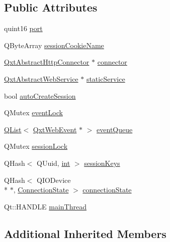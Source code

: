 \subsection*{Public Attributes}
\begin{DoxyCompactItemize}
\item 
quint16 \hyperlink{class_qxt_http_session_manager_private_afaed4122891eaeae95a49b4c06194a71}{port}
\item 
Q\-Byte\-Array \hyperlink{class_qxt_http_session_manager_private_afff38a099b0c4d6a1f7da9b5eca8fac6}{session\-Cookie\-Name}
\item 
\hyperlink{class_qxt_abstract_http_connector}{Qxt\-Abstract\-Http\-Connector} $\ast$ \hyperlink{class_qxt_http_session_manager_private_a4f6a26ca27a73031645ad29d7fb3a500}{connector}
\item 
\hyperlink{class_qxt_abstract_web_service}{Qxt\-Abstract\-Web\-Service} $\ast$ \hyperlink{class_qxt_http_session_manager_private_a53d1396f3681011b1345b459ea6ffd61}{static\-Service}
\item 
bool \hyperlink{class_qxt_http_session_manager_private_aa2c0b26defa494309178f9c0e4cc3765}{auto\-Create\-Session}
\item 
Q\-Mutex \hyperlink{class_qxt_http_session_manager_private_a64f900c3f04fc7a73a9f3fe5d5c0727d}{event\-Lock}
\item 
\hyperlink{class_q_list}{Q\-List}$<$ \hyperlink{class_qxt_web_event}{Qxt\-Web\-Event} $\ast$ $>$ \hyperlink{class_qxt_http_session_manager_private_a7fce9c9c9e2fe2f22dc3bfa1fac4425d}{event\-Queue}
\item 
Q\-Mutex \hyperlink{class_qxt_http_session_manager_private_a0773bccaca233732094d7327467a012d}{session\-Lock}
\item 
Q\-Hash$<$ Q\-Uuid, \hyperlink{ioapi_8h_a787fa3cf048117ba7123753c1e74fcd6}{int} $>$ \hyperlink{class_qxt_http_session_manager_private_a981d0670f9d5dbfcf02216b3dc977952}{session\-Keys}
\item 
Q\-Hash$<$ Q\-I\-O\-Device \\*
$\ast$, \hyperlink{struct_qxt_http_session_manager_private_1_1_connection_state}{Connection\-State} $>$ \hyperlink{class_qxt_http_session_manager_private_a1793ddf01228a5ec03e28a3bbff8053a}{connection\-State}
\item 
Qt\-::\-H\-A\-N\-D\-L\-E \hyperlink{class_qxt_http_session_manager_private_a6779e8abdff2f0531a087d41b59f6b94}{main\-Thread}
\end{DoxyCompactItemize}
\subsection*{Additional Inherited Members}


